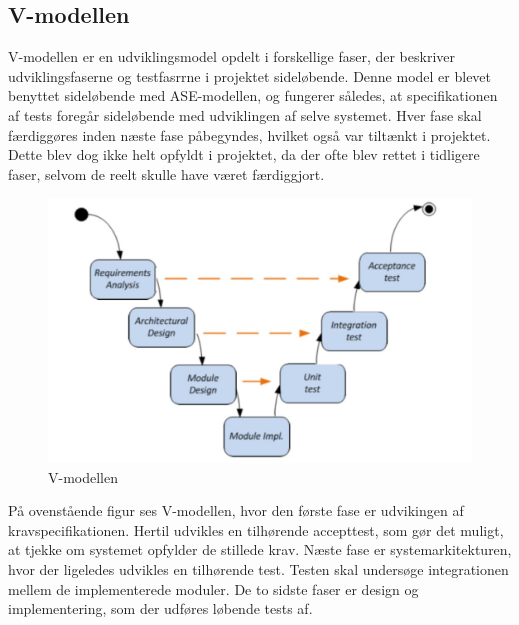 \subsection{V-modellen}
V-modellen er en udviklingsmodel opdelt i forskellige faser, der beskriver udviklingsfaserne og testfasrrne i projektet sideløbende. Denne model er blevet benyttet sideløbende med ASE-modellen, og fungerer således, at specifikationen af tests foregår sideløbende med udviklingen af selve systemet. Hver fase skal færdiggøres inden næste fase påbegyndes, hvilket også var tiltænkt i projektet. Dette blev dog ikke helt opfyldt i projektet, da der ofte blev rettet i tidligere faser, selvom de reelt skulle have været færdiggjort.
\begin{figure}[H]
	\centering
	\includegraphics[width=1\textwidth]{Figurer/vmodel}
	\caption{V-modellen}
\end{figure}
På ovenstående figur ses V-modellen, hvor den første fase er udvikingen af kravspecifikationen. Hertil udvikles en tilhørende accepttest, som gør det muligt, at tjekke om systemet opfylder de stillede krav. Næste fase er systemarkitekturen, hvor der ligeledes udvikles en tilhørende test. Testen skal undersøge integrationen mellem de implementerede moduler. De to sidste faser er design og implementering, som der udføres løbende tests af. 

